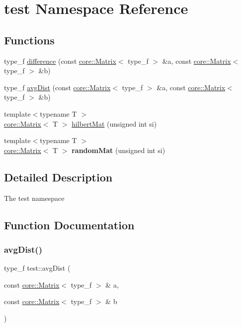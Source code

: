 \hypertarget{namespacetest}{}\section{test Namespace Reference}
\label{namespacetest}
\subsection*{Functions}
\begin{DoxyCompactItemize}
\item 
type\+\_\+f \mbox{\hyperlink{namespacetest_a5fa6ad5296bb640131d54f53244f8ee0}{difference}} (const \mbox{\hyperlink{classcore_1_1_matrix}{core\+::\+Matrix}}$<$ type\+\_\+f $>$ \&a, const \mbox{\hyperlink{classcore_1_1_matrix}{core\+::\+Matrix}}$<$ type\+\_\+f $>$ \&b)
\item 
type\+\_\+f \mbox{\hyperlink{namespacetest_a7322da5594e945b67d3303b09b95bd1d}{avg\+Dist}} (const \mbox{\hyperlink{classcore_1_1_matrix}{core\+::\+Matrix}}$<$ type\+\_\+f $>$ \&a, const \mbox{\hyperlink{classcore_1_1_matrix}{core\+::\+Matrix}}$<$ type\+\_\+f $>$ \&b)
\item 
{\footnotesize template$<$typename T $>$ }\\\mbox{\hyperlink{classcore_1_1_matrix}{core\+::\+Matrix}}$<$ T $>$ \mbox{\hyperlink{namespacetest_aeacee8b5c1a346797ca29db3294b6fc0}{hilbert\+Mat}} (unsigned int si)
\item 
\mbox{\label{namespacetest_a49073fdd95d2f12ffbed4d0fbf9816ad}} 
{\footnotesize template$<$typename T $>$ }\\\mbox{\hyperlink{classcore_1_1_matrix}{core\+::\+Matrix}}$<$ T $>$ {\bfseries random\+Mat} (unsigned int si)
\end{DoxyCompactItemize}


\subsection{Detailed Description}
The test namespace 

\subsection{Function Documentation}
\mbox{\label{namespacetest_a7322da5594e945b67d3303b09b95bd1d}} 
\subsubsection{\texorpdfstring{avg\+Dist()}{avgDist()}}
{\footnotesize\ttfamily type\+\_\+f test\+::avg\+Dist (\begin{DoxyParamCaption}\item[{const \mbox{\hyperlink{classcore_1_1_matrix}{core\+::\+Matrix}}$<$ type\+\_\+f $>$ \&}]{a,  }\item[{const \mbox{\hyperlink{classcore_1_1_matrix}{core\+::\+Matrix}}$<$ type\+\_\+f $>$ \&}]{b }\end{DoxyParamCaption})}

